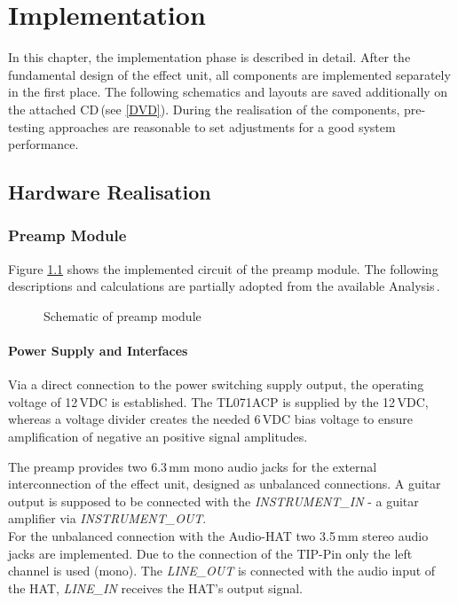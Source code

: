 \newpage
\chapter{Implementation}

In this chapter, the implementation phase is described in detail. After the fundamental design of the effect unit, all components are implemented separately in the first place. The following schematics and layouts are saved additionally on the attached CD\,(see \ref{DVD}).
During the realisation of the components, pre-testing approaches are reasonable to set adjustments for a good system performance.  

\section{Hardware Realisation}

\subsection{Preamp Module}

Figure \ref{fig:Preamp_schematic} shows the implemented circuit of the preamp module.
The following descriptions and calculations are partially adopted from the available Analysis\,\cite{ElectroSmash:2017}.

\begin{figure}[H]
	\caption[Preamp_schematic]{Schematic of preamp module}
	\label{fig:Preamp_schematic}
	
\end{figure}


\subsubsection{Power Supply and Interfaces}

Via a direct connection to the power switching supply output, the operating voltage of 12\,VDC is established. The TL071ACP is supplied by the 12\,VDC, whereas a voltage divider creates the needed 6\,VDC
bias voltage to ensure amplification of negative an positive signal amplitudes.

The preamp provides two 6.3\,mm mono audio jacks for the external interconnection of the effect unit, designed as unbalanced connections. A guitar output is supposed to be connected with the \textit{INSTRUMENT\_IN} - a guitar amplifier via \textit{INSTRUMENT\_OUT}.\\
For the unbalanced connection with the Audio-HAT two 3.5\,mm stereo audio jacks are implemented.
Due to the connection of the TIP-Pin only the left channel is used (mono).
The \textit{LINE\_OUT} is connected with the audio input of the HAT, \textit{LINE\_IN} receives the HAT's 
output signal.\\
\\




